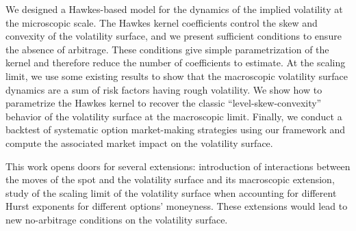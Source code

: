 \documentclass[12pt]{article}
\begin{document}
We designed a Hawkes-based model for the dynamics of the implied volatility at the microscopic scale. The Hawkes kernel coefficients control the skew and convexity of the volatility surface, and we present sufficient conditions to ensure the absence of arbitrage. These conditions give simple parametrization of the kernel and therefore reduce the number of coefficients to estimate. At the scaling limit, we use some existing results to show that the macroscopic volatility surface dynamics are a sum of risk factors having rough volatility. We show how to parametrize the Hawkes kernel to recover the classic ``level-skew-convexity'' behavior of the volatility surface at the macroscopic limit. Finally, we conduct a backtest of systematic option market-making strategies using our framework and compute the associated market impact on the volatility surface.\medskip

This work opens doors for several extensions: introduction of interactions between the moves of the spot and the volatility surface and its macroscopic extension, study of the scaling limit of the volatility surface when accounting for different Hurst exponents for different options' moneyness. These extensions would lead to new no-arbitrage conditions on the volatility surface. 




\end{document}

